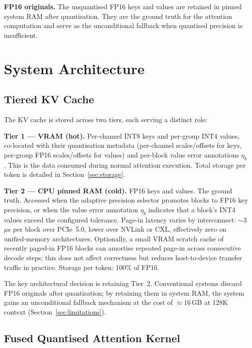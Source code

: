 \documentclass[10pt,twocolumn,a4paper]{article}
\theoremstyle{definition}
\theoremstyle{remark}
\begin{document}
\textbf{FP16 originals.}  The unquantised FP16 keys and values are retained in pinned system RAM after quantisation.  They are the ground truth for the attention computation and serve as the unconditional fallback when quantised precision is insufficient.


\section{System Architecture}
\label{sec:arch}

\subsection{Tiered KV Cache}
\label{sec:tiered}

The KV cache is stored across two tiers, each serving a distinct role:

\textbf{Tier 1 --- VRAM (hot).}  Per-channel INT8 keys and per-group INT4 values, co-located with their quantisation metadata (per-channel scales/offsets for keys, per-group FP16 scales/offsets for values) and per-block value error annotations $\eta_b$.  This is the data consumed during normal attention execution.  Total storage per token is detailed in Section~\ref{sec:storage}.

\textbf{Tier 2 --- CPU pinned RAM (cold).}  FP16 keys and values.  The ground truth.  Accessed when the adaptive precision selector promotes blocks to FP16 key precision, or when the value error annotation $\eta_b$ indicates that a block's INT4 values exceed the configured tolerance.  Page-in latency varies by interconnect: ${\sim}3$\,$\mu$s per block over PCIe~5.0, lower over NVLink or CXL, effectively zero on unified-memory architectures.  Optionally, a small VRAM scratch cache of recently paged-in FP16 blocks can amortise repeated page-in across consecutive decode steps; this does not affect correctness but reduces host-to-device transfer traffic in practice.  Storage per token: 100\% of FP16.

The key architectural decision is retaining Tier~2.  Conventional systems discard FP16 originals after quantisation; by retaining them in system RAM, the system gains an unconditional fallback mechanism at the cost of $\approx 16$\,GB at 128K context (Section~\ref{sec:limitations}).

\subsection{Fused Quantised Attention Kernel}
\label{sec:kernel}
\end{document}
